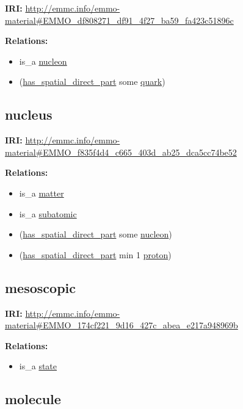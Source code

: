 \documentclass[a4paper,]{report}
\providecommand{\tightlist}{%
  \setlength{\itemsep}{0pt}\setlength{\parskip}{0pt}}
\begin{document}
\textbf{IRI:}
\url{http://emmc.info/emmo-material\#EMMO_df808271_df91_4f27_ba59_fa423c51896c}

\textbf{Relations:}

\begin{itemize}
\tightlist
\item
  is\_a \protect\hyperlink{nucleon}{nucleon}
\item
  (\protect\hyperlink{has_spatial_direct_part}{has\_spatial\_direct\_part}
  some \protect\hyperlink{quark}{quark})
\end{itemize}

\hypertarget{nucleus}{%
\subsection{nucleus}\label{nucleus}}

\textbf{IRI:}
\url{http://emmc.info/emmo-material\#EMMO_f835f4d4_c665_403d_ab25_dca5cc74be52}

\textbf{Relations:}

\begin{itemize}
\tightlist
\item
  is\_a \protect\hyperlink{matter}{matter}
\item
  is\_a \protect\hyperlink{subatomic}{subatomic}
\item
  (\protect\hyperlink{has_spatial_direct_part}{has\_spatial\_direct\_part}
  some \protect\hyperlink{nucleon}{nucleon})
\item
  (\protect\hyperlink{has_spatial_direct_part}{has\_spatial\_direct\_part}
  min 1 \protect\hyperlink{proton}{proton})
\end{itemize}

\hypertarget{mesoscopic}{%
\subsection{mesoscopic}\label{mesoscopic}}

\textbf{IRI:}
\url{http://emmc.info/emmo-material\#EMMO_174cf221_9d16_427c_abea_e217a948969b}

\textbf{Relations:}

\begin{itemize}
\tightlist
\item
  is\_a \protect\hyperlink{state}{state}
\end{itemize}

\hypertarget{molecule}{%
\subsection{molecule}\label{molecule}}
\end{document}
